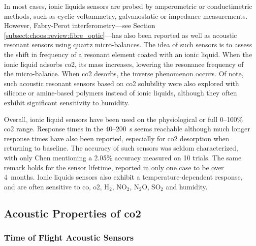 In most cases, ionic liquids sensors are probed by amperometric or conductimetric methods, such as cyclic voltammetry, galvanostatic or impedance measurements. However, Fabry-Perot interferometry---see Section \ref{subsect:choos:review:fibre_optic}---has also been reported\cite{wu2018} as well as acoustic resonant sensors using quartz micro-balances\cite{mineo2012, xiao2013}. The idea of such sensors is to assess the shift in frequency of a resonant element coated with an ionic liquid. When the ionic liquid adsorbs \gls{co2}, its mass increases, lowering the resonance frequency of the micro-balance. When \gls{co2} desorbs, the inverse phenomenon occurs. Of note, such acoustic resonant sensors based on \gls{co2} solubility were also explored with silicone or amine-based polymers instead of ionic liquids\cite{zhou1994, gomes1995, lee2012, hoffman2017, siefker2021}, although they often exhibit significant sensitivity to humidity.

Overall, ionic liquid sensors have been used on the physiological\cite{fapyane2020} or full 0--100\%\cite{rosen2010, mineo2012} \gls{co2} range. Response times in the 40--200~s seems reachable\cite{chen2011, mineo2012, fapyane2020} although much longer response times have also been reported, especially for \gls{co2} desorption when returning to baseline\cite{ishizu2013, willa2015, willa2017}. The accuracy of such sensors was seldom characterized, with only Chen \etal{}\cite{chen2011} mentioning a 2.05\% accuracy measured on 10 trials. The same remark holds for the sensor lifetime, reported in only one case to be over 4~months\cite{fapyane2020}. Ionic liquids sensors also exhibit a temperature-dependent response\cite{revsbech2019, fapyane2020}, and are often sensitive to \gls{co}, \gls{o2}, H$_2$, NO$_2$, N$_2$O, SO$_2$ and humidity\cite{chen2011, li2012, fapyane2020}.


\subsection{Acoustic Properties of \texorpdfstring{\gls{co2}}{CO2}}\label{subsect:choos:review:acoustic}

\subsubsection{Time of Flight Acoustic Sensors}\label{subsect:choos:review:tof}

